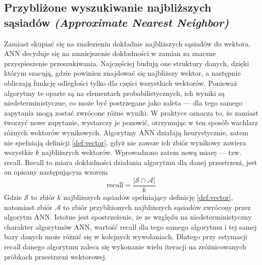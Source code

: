 \documentclass[twocolumn]{article}
\begin{document}
\subsection{Przybliżone wyszukiwanie najbliższych sąsiadów \newline \textit{(Approximate Nearest Neighbor)}}
Zamiast skupiać się na znalezieniu dokładnie najbliższych sąsiadów do wektora, ANN decyduje się na zmniejszenie dokładności w zamian za znaczne przyspieszenie przeszukiwania. Najczęściej budują one struktury danych, dzięki którym szacują, gdzie powinien znajdować się najbliższy wektor, a następnie obliczają funkcję odległości tylko dla części wszystkich wektorów. Ponieważ algorytmy te oparte są na elementach probabilistycznych, ich wyniki są niedeterministyczne, co może być postrzegane jako zaleta — dla tego samego zapytania mogą zostać zwrócone różne wyniki. W praktyce oznacza to, że zamiast tworzyć nowe zapytanie, wystarczy je ponowić, otrzymując w ten sposób wachlarz różnych wektorów wynikowych.
\newline
Algorytmy ANN działają heurystycznie, zatem nie spełniają definicji
\ref{def:vector}, gdyż nie zawsze ich zbiór wynikowy zawiera wszystkie $k$ najbliższych wektorów. Wprowadzono zatem nową miarę — tzw. recall. Recall to miara dokładności działania algorytmu dla danej przestrzeni, jest on opisany następującym wzorem
\[
\text{recall} = \frac{\left|\mathcal{S} \cap \mathcal{A}\right|}{k}
\]
Gdzie $\mathcal{S}$ to zbiór $k$ najbliższych sąsiadów spełniający definicję \ref{def:vector}, natomiast zbiór $\mathcal{A}$ to zbiór przybliżonych najbliższych sąsiadów zwrócony przez algorytm ANN. 
Istotne jest spostrzeżenie, że ze względu na niedeterministyczny charakter algorytmów ANN, wartość recall dla tego samego algorytmu i tej samej bazy danych może różnić się w kolejnych wywołaniach. Dlatego przy estymacji recall danego algorytmu zaleca się wykonanie wielu iteracji na zróżnicowanych próbkach przestrzeni wektorowej.
\vfill
\break
\end{document}

